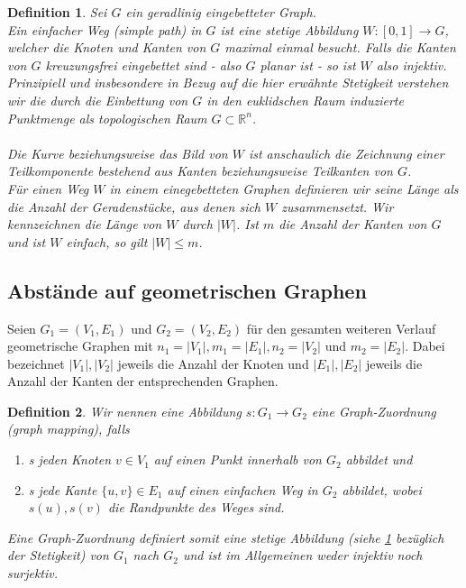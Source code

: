 \documentclass[a4paper, 12pt, twoside]{article}
\theoremstyle{Format1} %
\newtheorem{Def}{Definition}[section]       %
\begin{document}
\begin{Def} \label{Definition Einfacher Weg}
	Sei $G$ ein geradlinig eingebetteter Graph.
	\\
	Ein \textit{einfacher Weg (simple path) in $G$} ist eine stetige Abbildung $W: [0,1] \to G$, welcher die Knoten und Kanten von $G$ maximal einmal besucht.
	Falls die Kanten von $G$ kreuzungsfrei eingebettet sind - also $G$ planar ist - so ist $W$ also injektiv.
	Prinzipiell und insbesondere in Bezug auf die hier erwähnte \textit{Stetigkeit} verstehen wir die durch die Einbettung von
	$G$ in den euklidschen Raum induzierte Punktmenge als \textit{topologischen Raum} $G \subset \mathbb{R}^n$.
	\\
	\\
	Die Kurve beziehungsweise das Bild von $W$ ist anschaulich die Zeichnung einer Teilkomponente bestehend aus
	Kanten beziehungsweise Teilkanten von $G$.
	\\
	Für einen Weg $W$ in einem einegebetteten Graphen definieren wir seine \textit{Länge} als die Anzahl der Geradenstücke, aus
	denen sich $W$ zusammensetzt. Wir kennzeichnen die Länge von $W$ durch $|W|$. Ist $m$ die Anzahl der Kanten von $G$ und ist $W$ einfach, so gilt
	$|W| \leq m$.
\end{Def}

\subsection{Abstände auf geometrischen Graphen}

Seien $ G_1=(V_1, E_1) $ und $ G_2=(V_2, E_2) $ für den gesamten weiteren Verlauf geometrische Graphen mit
$n_1 = |V_1|, m_1 = |E_1|, n_2 = |V_2|$ und $m_2 = |E_2|$. Dabei bezeichnet $|V_1|, |V_2|$ jeweils die Anzahl der Knoten und $|E_1|,|E_2|$ jeweils die Anzahl der Kanten
der entsprechenden Graphen.

\begin{Def} \label{Definition Graph-Zuordnung}
	Wir nennen eine Abbildung $s: G_1 \to G_2 $ eine \textit{Graph-Zuordnung (graph mapping)}, falls
    	\begin{enumerate}
		\item[1)] s jeden Knoten $ v \in V_1 $ auf einen Punkt innerhalb von $ G_2 $ abbildet und
		\item[2)] s jede Kante $ \{u,v\} \in E_1 $ auf einen einfachen Weg in $G_2$ abbildet, wobei $s(u), s(v)$ die Randpunkte des Weges sind.
    	\end{enumerate}

	Eine Graph-Zuordnung definiert somit eine stetige Abbildung (siehe \ref{Definition Einfacher Weg} bezüglich der Stetigkeit) von $ G_1 $ nach $ G_2 $
	und ist im Allgemeinen weder injektiv noch surjektiv.
\end{Def}
\end{document}
